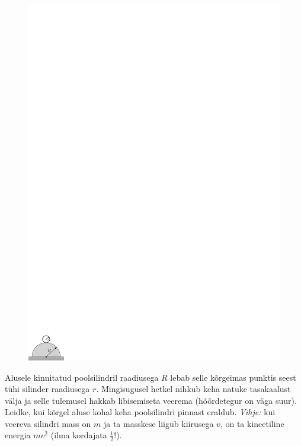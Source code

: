 \documentclass[10pt, twoside]{article}
\begin{document}
{
\begin{figure}
	\vspace{-10pt}
	\hspace{-8pt}
	\includegraphics[width=\linewidth]{2010-lahg-03-silindri_joonis_ipe}
\end{figure}

Alusele kinnitatud poolsilindril raadiusega $R$
lebab selle kõrgeimas punktis seest tühi silinder
raadiusega $r$. Mingisugusel hetkel nihkub keha natuke tasakaalust välja ja
selle tulemusel hakkab libisemiseta veerema (hõõrdetegur on väga suur). Leidke, kui kõrgel aluse kohal keha
poolsilindri pinnast eraldub. \emph{Vihje:} kui veereva silindri mass on $m$ ja
ta masskese liigub kiirusega $v$, on ta kineetiline energia $m v^2$ (ilma
kordajata $\frac12$!).
\probend
\bigskip


}
\end{document}
